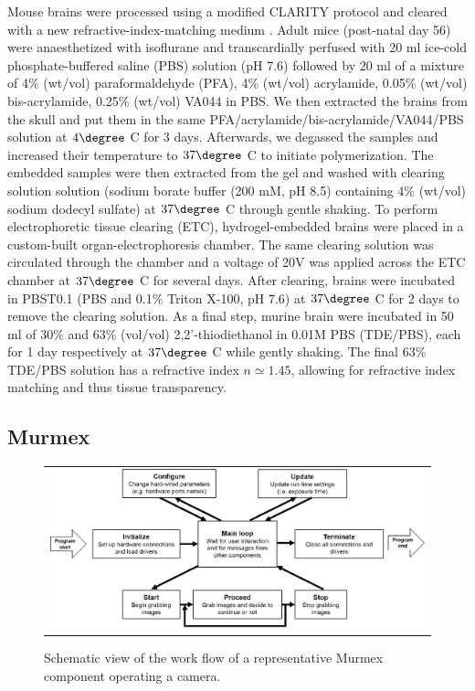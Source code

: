 \documentclass[12pt]{spieman}  %
\begin{document}
\begin{spacing}{2}
Mouse brains were processed using a modified CLARITY protocol \cite{Chung2013} and cleared with a new refractive-index-matching medium \cite{Costantini}. Adult mice (post-natal day 56) were anaesthetized with isoflurane and transcardially perfused with 20 ml ice-cold phosphate-buffered saline (PBS) solution (pH 7.6) followed by 20 ml of a mixture of 4\% (wt/vol) paraformaldehyde (PFA), 4\% (wt/vol) acrylamide, 0.05\% (wt/vol) bis-acrylamide, 0.25\% (wt/vol) VA044 in PBS. We then extracted the brains from the skull and put them in the same PFA/acrylamide/bis-acrylamide/VA044/PBS solution at $4 \degree$ C for 3 days. Afterwards, we degassed the samples and increased their temperature to $37 \degree$ C to initiate polymerization. The embedded samples were then extracted from the gel and washed with clearing solution solution (sodium borate buffer (200 mM, pH 8.5) containing 4\% (wt/vol) sodium dodecyl sulfate) at $37 \degree $ C through gentle shaking. To perform electrophoretic tissue clearing (ETC), hydrogel-embedded brains were placed in a custom-built organ-electrophoresis chamber. The same clearing solution was circulated through the chamber and a voltage of 20V was applied across the ETC chamber at $37 \degree$ C for several days. After clearing, brains were incubated in PBST0.1 (PBS and 0.1\% Triton X-100, pH 7.6) at $37 \degree$ C for 2 days to remove the clearing solution. As a final step, murine brain were incubated in 50 ml of 30\% and 63\% (vol/vol) 2,2'-thiodiethanol in 0.01M PBS (TDE/PBS), each for 1 day respectively at $37 \degree$ C while gently shaking. The final 63\% TDE/PBS solution has a refractive index $n\simeq 1.45$, allowing for refractive index matching and thus tissue transparency.



\subsection{Murmex}
\label{sec:murmex}
	\begin{figure}
   \begin{center}
   \begin{tabular}{c}
   \includegraphics[width=\textwidth]{murmex.eps}
   \end{tabular}
   \end{center}
   \caption{\label{fig:murmex} Schematic view of the work flow of a representative Murmex component operating a camera.} 
   \end{figure}


\end{spacing}
\end{document}
